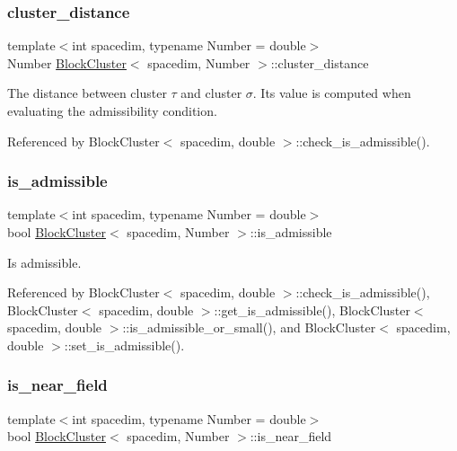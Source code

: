 \subsubsection{\texorpdfstring{cluster\+\_\+distance}{cluster\_distance}}
{\footnotesize\ttfamily template$<$int spacedim, typename Number = double$>$ \\
Number \hyperlink{classBlockCluster}{Block\+Cluster}$<$ spacedim, Number $>$\+::cluster\+\_\+distance\hspace{0.3cm}{\ttfamily [private]}}

The distance between cluster $\tau$ and cluster $\sigma$. Its value is computed when evaluating the admissibility condition. 

Referenced by Block\+Cluster$<$ spacedim, double $>$\+::check\+\_\+is\+\_\+admissible().

\mbox{\label{classBlockCluster_ae85d165894d10b7e58fbe20edd506abe}} 
\subsubsection{\texorpdfstring{is\+\_\+admissible}{is\_admissible}}
{\footnotesize\ttfamily template$<$int spacedim, typename Number = double$>$ \\
bool \hyperlink{classBlockCluster}{Block\+Cluster}$<$ spacedim, Number $>$\+::is\+\_\+admissible\hspace{0.3cm}{\ttfamily [private]}}

Is admissible. 

Referenced by Block\+Cluster$<$ spacedim, double $>$\+::check\+\_\+is\+\_\+admissible(), Block\+Cluster$<$ spacedim, double $>$\+::get\+\_\+is\+\_\+admissible(), Block\+Cluster$<$ spacedim, double $>$\+::is\+\_\+admissible\+\_\+or\+\_\+small(), and Block\+Cluster$<$ spacedim, double $>$\+::set\+\_\+is\+\_\+admissible().

\mbox{\label{classBlockCluster_a6f719cbd6a646328f8128355c857745a}} 
\subsubsection{\texorpdfstring{is\+\_\+near\+\_\+field}{is\_near\_field}}
{\footnotesize\ttfamily template$<$int spacedim, typename Number = double$>$ \\
bool \hyperlink{classBlockCluster}{Block\+Cluster}$<$ spacedim, Number $>$\+::is\+\_\+near\+\_\+field\hspace{0.3cm}{\ttfamily [private]}}

